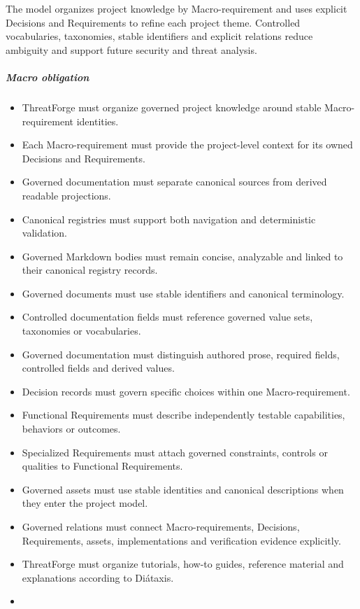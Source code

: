 \documentclass[
  10pt,
]{article}
\providecommand{\tightlist}{%
  \setlength{\itemsep}{0pt}\setlength{\parskip}{0pt}}
\begin{document}
The model organizes project knowledge by Macro-requirement and uses
explicit Decisions and Requirements to refine each project theme.
Controlled vocabularies, taxonomies, stable identifiers and explicit
relations reduce ambiguity and support future security and threat
analysis.

\subparagraph{Macro obligation}\label{macro-obligation}

\begin{itemize}
\tightlist
\item
  ThreatForge must organize governed project knowledge around stable
  Macro-requirement identities.
\item
  Each Macro-requirement must provide the project-level context for its
  owned Decisions and Requirements.
\item
  Governed documentation must separate canonical sources from derived
  readable projections.
\item
  Canonical registries must support both navigation and deterministic
  validation.
\item
  Governed Markdown bodies must remain concise, analyzable and linked to
  their canonical registry records.
\item
  Governed documents must use stable identifiers and canonical
  terminology.
\item
  Controlled documentation fields must reference governed value sets,
  taxonomies or vocabularies.
\item
  Governed documentation must distinguish authored prose, required
  fields, controlled fields and derived values.
\item
  Decision records must govern specific choices within one
  Macro-requirement.
\item
  Functional Requirements must describe independently testable
  capabilities, behaviors or outcomes.
\item
  Specialized Requirements must attach governed constraints, controls or
  qualities to Functional Requirements.
\item
  Governed assets must use stable identities and canonical descriptions
  when they enter the project model.
\item
  Governed relations must connect Macro-requirements, Decisions,
  Requirements, assets, implementations and verification evidence
  explicitly.
\item
  ThreatForge must organize tutorials, how-to guides, reference material
  and explanations according to Diátaxis.
\item

\end{itemize}
\end{document}
